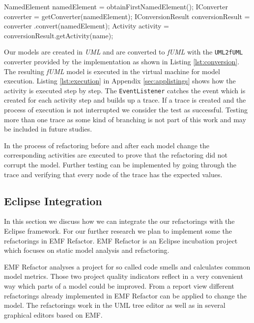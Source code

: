 \documentclass{llncs}
\begin{document}
\begin{lstsingle}[language=Java,caption=Converting the UML diagram to fUML,label=lst:conversion]
NamedElement namedElement = obtainFirstNamedElement();
IConverter converter = getConverter(namedElement);
IConversionResult conversionResult = converter
  .convert(namedElement);
Activity activity = conversionResult.getActivity(name);
\end{lstsingle}

Our models are created in \textit{UML} and are converted to \textit{fUML} with the \texttt{UML2fUML} converter 
provided by the implementation as shown in Listing \ref{lst:conversion}. The resulting \textit{fUML} model is executed in the 
virtual machine for model execution. Listing \ref{lst:execution} in Appendix \ref{sec:applistings} shows how the activity is executed step by step. The \texttt{EventListener} 
catches the event which is created for each activity step and builds up a trace. If a trace is created and the process of execution is not interrupted we consider the 
test as successful. Testing more than one trace as some kind of branching is not part of this work and may be included in future studies.

In the process of refactoring before and after each model change the corresponding activities are executed to prove that 
the refactoring did not corrupt the model.
Further testing can be implemented by going through the trace and verifying 
that every node of the trace has the expected values.

\subsection{Eclipse Integration}
\label{sec:guiintegration}
In this section we discuss how we can integrate the our refactorings with the Eclipse framework. For our further 
research we plan to implement some the refactorings in EMF Refactor. EMF Refactor is an Eclipse incubation project 
which focuses on static model analysis and refactoring.

EMF Refactor analyses a project for so called code smells and calculates common model metrics. Those two project quality 
indicators reflect in a very convenient way which parts of a model could be improved. From a report view different 
refactorings already implemented in EMF Refactor can be applied to change the model. The refactorings work in the UML tree 
editor as well as in several graphical editors based on EMF.
\end{document}
